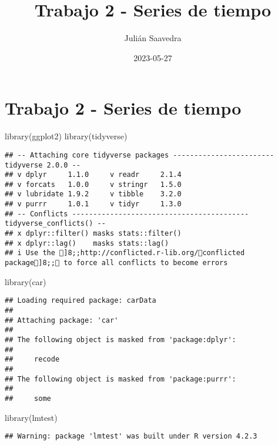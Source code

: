 \documentclass[
]{article}
\title{Trabajo 2 - Series de tiempo}
\author{Julián Saavedra}
\date{2023-05-27}
\newenvironment{Shaded}{\begin{snugshade}}{\end{snugshade}}
\newcommand{\FunctionTok}[1]{\textcolor[rgb]{0.00,0.00,0.00}{#1}}
\newcommand{\NormalTok}[1]{#1}
\begin{document}
\maketitle

\hypertarget{trabajo-2---series-de-tiempo}{%
\section{Trabajo 2 - Series de
tiempo}\label{trabajo-2---series-de-tiempo}}

\begin{Shaded}
\begin{Highlighting}[]
\FunctionTok{library}\NormalTok{(ggplot2)}
\FunctionTok{library}\NormalTok{(tidyverse)}
\end{Highlighting}
\end{Shaded}

\begin{verbatim}
## -- Attaching core tidyverse packages ------------------------ tidyverse 2.0.0 --
## v dplyr     1.1.0     v readr     2.1.4
## v forcats   1.0.0     v stringr   1.5.0
## v lubridate 1.9.2     v tibble    3.2.0
## v purrr     1.0.1     v tidyr     1.3.0
## -- Conflicts ------------------------------------------ tidyverse_conflicts() --
## x dplyr::filter() masks stats::filter()
## x dplyr::lag()    masks stats::lag()
## i Use the ]8;;http://conflicted.r-lib.org/conflicted package]8;; to force all conflicts to become errors
\end{verbatim}

\begin{Shaded}
\begin{Highlighting}[]
\FunctionTok{library}\NormalTok{(car)}
\end{Highlighting}
\end{Shaded}

\begin{verbatim}
## Loading required package: carData
## 
## Attaching package: 'car'
## 
## The following object is masked from 'package:dplyr':
## 
##     recode
## 
## The following object is masked from 'package:purrr':
## 
##     some
\end{verbatim}

\begin{Shaded}
\begin{Highlighting}[]
\FunctionTok{library}\NormalTok{(lmtest)}
\end{Highlighting}
\end{Shaded}

\begin{verbatim}
## Warning: package 'lmtest' was built under R version 4.2.3
\end{verbatim}
\end{document}
